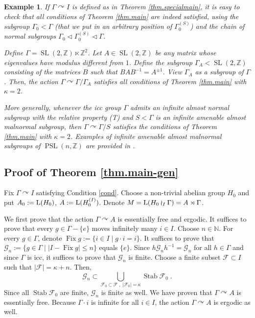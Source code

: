 \documentclass[a4paper,11pt]{amsart}
\numberwithin{equation}{section}
\newtheorem{example}[definition]{Example}
\begin{document}
\begin{example}\label{ex.ourex}
If $\Gamma {\curvearrowright} I$ is defined as in Theorem \ref{thm.specialmain}, it is easy to check that all conditions of Theorem \ref{thm.main} are indeed satisfied, using the subgroup $\Gamma_0 < \Gamma$ (that we put in an arbitrary position of $\Gamma_0^{(S)}$) and the chain of normal subgroups $\Gamma_0 \lhd \Gamma_0^{(S)} \lhd \Gamma$.

Define $\Gamma = {\operatorname{SL}}(2,{\mathbb{Z}}) \ltimes {\mathbb{Z}}^2$. Let $A \in {\operatorname{SL}}(2,{\mathbb{Z}})$ be any matrix whose eigenvalues have modulus different from $1$. Define the subgroup $\Gamma_A < {\operatorname{SL}}(2,{\mathbb{Z}})$ consisting of the matrices $B$ such that $B A B^{-1} = A^{\pm 1}$. View $\Gamma_A$ as a subgroup of $\Gamma$.
Then, the action $\Gamma {\curvearrowright} \Gamma/\Gamma_A$ satisfies all conditions of Theorem \ref{thm.main} with $\kappa =2$.

More generally, whenever the icc group $\Gamma$ admits an infinite almost normal subgroup with the relative property (T) and $S < \Gamma$ is an infinite amenable almost malnormal subgroup, then $\Gamma {\curvearrowright} \Gamma/S$ satisfies the conditions of Theorem \ref{thm.main} with $\kappa = 2$. Examples of infinite amenable almost malnormal subgroups of ${\operatorname{PSL}}(n,{\mathbb{Z}})$ are provided in \cite[Example 7.4]{PV06}.
\end{example}

\subsection*{Proof of Theorem \ref{thm.main-gen}}\mbox{}

Fix $\Gamma {\curvearrowright} I$ satisfying Condition \ref{cond}. Choose a non-trivial abelian group $H_0$ and put $A_0 := {\mathord{\text{\rm L}}}(H_0)$, $A := {\mathord{\text{\rm L}}}(H_0^{(I)})$. Denote $M = {\mathord{\text{\rm L}}}(H_0 \wr_I \Gamma) = A \rtimes \Gamma$.

We first prove that the action $\Gamma {\curvearrowright} A$ is essentially free and ergodic. It suffices to prove that every $g \in \Gamma - \{e\}$ moves infinitely many $i \in I$. Choose $n \in {\mathbb{N}}$. For every $g \in \Gamma$, denote ${\operatorname{Fix}} g := \{i \in I \mid g \cdot i = i \}$. It suffices to prove that ${\mathcal{G}}_n := \{g \in \Gamma \mid |I - {\operatorname{Fix}} g| {\leqslant} n\}$ equals $\{e\}$. Since $h {\mathcal{G}}_n h^{-1} = {\mathcal{G}}_n$ for all $h \in \Gamma$ and since $\Gamma$ is icc, it suffices to prove that ${\mathcal{G}}_n$ is finite. Choose a finite subset ${\mathcal{F}} \subset I$ such that $|{\mathcal{F}}| = \kappa + n$. Then,
$${\mathcal{G}}_n \subset \bigcup_{{\mathcal{F}}_0 \subset {\mathcal{F}} \; , \; |{\mathcal{F}}_0| = \kappa} {\operatorname{Stab}} {\mathcal{F}}_0 \; .$$
Since all ${\operatorname{Stab}} {\mathcal{F}}_0$ are finite, ${\mathcal{G}}_n$ is finite as well. We have proven that $\Gamma {\curvearrowright} A$ is essentially free. Because $\Gamma \cdot i$ is infinite for all $i \in I$, the action $\Gamma {\curvearrowright} A$ is ergodic as well.
\end{document}
